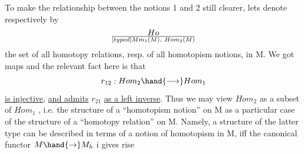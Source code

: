 To make the relationship between the notions 1\hand{)} and 2\hand{)} still clearer,
lets denote respectively by
\[ Ho\over[typed]{M}{m}_1(M),\ Hom_2(M) \]
the set of all homotopy  relations,  resp. of all homotopism
notions,  in M.  We got maps\hand{*}
and the relevant fact here is that
\[ r_{12}: Hom_2 \hand{\ensuremath{\longrightarrow}} Hom_1 \]
\uline{is injective},  \uline{and admits} $r_{21}$ \uline{as a left inverse}.  Thus we may view
$Hom_2$ as a subset of $Hom_1$ ,  i.e. the structure of a ``homotopism notion'' on
M as a particular case of the structure of a ``homotopy relation'' on M.
Namely,  a structure of the latter type can be described in terms of a
notion of homotopism in M,  iff the canonical functor $M \hand{\ensuremath{\to}} M_h$ i gives rise

